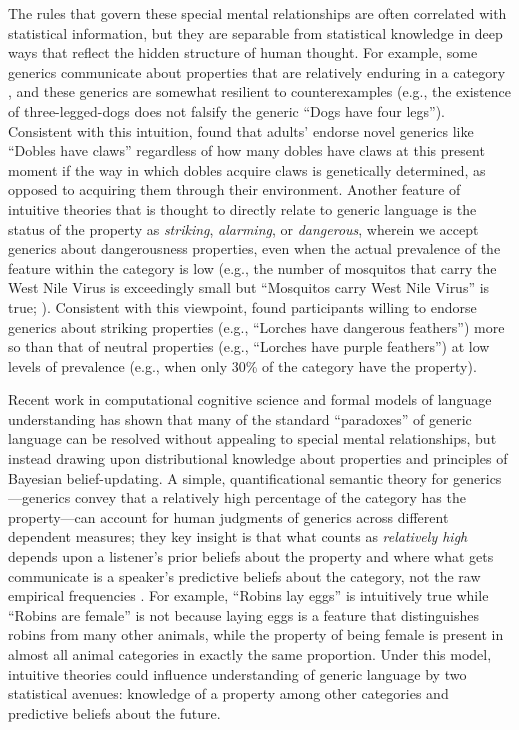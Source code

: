 \documentclass[floatsintext,doc]{apa6}
\begin{document}
The rules that govern these special mental relationships are often correlated with statistical information, but they are separable from statistical knowledge in deep ways that reflect the hidden structure of human thought.
For example, some generics communicate about properties that are relatively enduring in a category \cite{Lyons1977, Prasada2006}, and these generics are somewhat resilient to counterexamples (e.g., the existence of three-legged-dogs does not falsify the generic ``Dogs have four legs'').
Consistent with this intuition, \cite{Gelman2007} found that adults' endorse novel generics like ``Dobles have claws'' regardless of how many dobles have claws at this present moment if the way in which dobles acquire claws is genetically determined, as opposed to acquiring them through their environment.
Another feature of intuitive theories that is thought to directly relate to generic language is the status of the property as \emph{striking}, \emph{alarming}, or \emph{dangerous}, wherein we accept generics about dangerousness properties, even when the actual prevalence of the feature within the category is low (e.g., the number of mosquitos that carry the West Nile Virus is exceedingly small but ``Mosquitos carry West Nile Virus'' is true; ). 
Consistent with this viewpoint,  found participants willing to endorse generics about striking properties (e.g., ``Lorches have dangerous feathers'') more so than that of neutral properties (e.g., ``Lorches have purple feathers'') at low levels of prevalence (e.g., when only 30\% of the category have the property).

Recent work in computational cognitive science and formal models of language understanding has shown that many of the standard ``paradoxes'' of generic language can be resolved without appealing to special mental relationships, but instead drawing upon distributional knowledge about properties and principles of Bayesian belief-updating.
A simple, quantificational semantic theory for generics---generics convey that a relatively high percentage of the category has the property---can account for human judgments of generics across different dependent measures; they key insight is that what counts as \emph{relatively high} depends upon a listener's prior beliefs about the property and where what gets communicate is a speaker's predictive beliefs about the category, not the raw empirical frequencies \cite{Tessler2019, TesslerGenIntMS}.
For example, ``Robins lay eggs'' is intuitively true while ``Robins are female'' is not because laying eggs is a feature that distinguishes robins from many other animals, while the property of being female is present in almost all animal categories in exactly the same proportion.
Under this model, intuitive theories could influence understanding of generic language by two statistical avenues: knowledge of a property among other categories and predictive beliefs about the future. 
\end{document}
